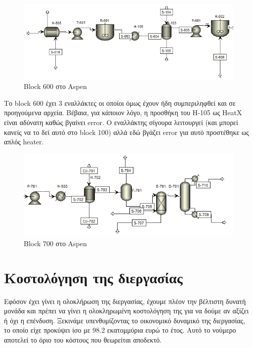 \documentclass[11pt]{article}
\begin{document}
\begin{figure}[htbp]
\centering
\includegraphics[width=.9\linewidth]{Blocks_της_διεργασίας_μετά_την_ενεργειακή_ολοκλήρωση/2023-04-27_15-00-23_screenshot.png}
\caption{Block 600 στο Aspen}
\end{figure}

Το block 600 έχει 3 εναλλάκτες οι οποίοι όμως έχουν ήδη συμπεριληφθεί και σε προηγούμενα αρχεία. Βέβαια, για κάποιον λόγο, η προσθήκη του H-105 ως HeatX είναι αδύνατη καθώς βγαίνει error. Ο εναλλάκτης σίγουρα λειτουργεί (και μπορεί κανείς να το δεί αυτό στο block 100) αλλά εδώ βγάζει error για αυτό προστέθηκε ως απλός heater.

\begin{figure}[htbp]
\centering
\includegraphics[width=.9\linewidth]{Blocks_της_διεργασίας_μετά_την_ενεργειακή_ολοκλήρωση/2023-04-27_15-02-15_screenshot.png}
\caption{Block 700 στο Aspen}
\end{figure}

\pagebreak

\section{Κοστολόγηση της διεργασίας}
\label{sec:orgada473a}
Εφόσον έχει γίνει η ολοκλήρωση της διεργασίας, έχουμε πλέον την βέλτιστη δυνατή μονάδα και πρέπει να γίνει η ολοκληρωμένη κοστολόγηση της για να δούμε αν αξίζει ή όχι η επένδυση. Ξεκινάμε υπενθυμίζοντας το οικονομικό δυναμικό της διεργασίας, το οποίο είχε προκύψει ίσο με 98.2 εκατομμύρια ευρώ το έτος. Αυτό το νούμερο αποτελεί το όριο του κόστους που θεωρείται αποδεκτό.
\end{document}
